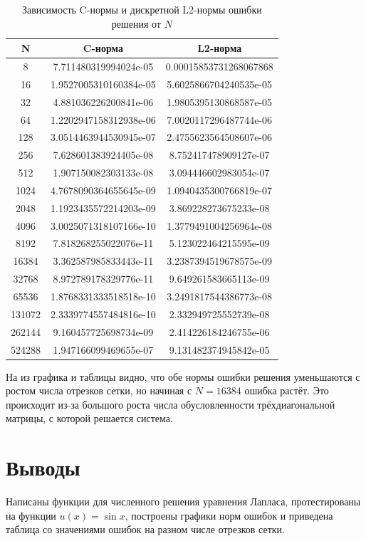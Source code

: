 \documentclass{article}
\begin{document}
\begin{table}[!hq]
    \centering
    \begin{tabular}{|c|c|c|}
        \hline
        N & C-норма & L2-норма \\ \hline
  8 & 7.711480319994024e-05 &  0.00015853731268067868 \\ \hline
  16 & 1.9527005310160384e-05 &  5.6025866704240535e-05 \\ \hline
  32 & 4.881036226200841e-06 &  1.9805395130868587e-05 \\ \hline
  64 & 1.2202947158312938e-06 &  7.0020117296487744e-06 \\ \hline
  128 & 3.0514463944530945e-07 &  2.4755623564508607e-06 \\ \hline
  256 & 7.628601383924405e-08 &  8.752417478909127e-07 \\ \hline
  512 & 1.907150082303133e-08 &  3.094446602983054e-07 \\ \hline
  1024 & 4.7678090364655645e-09 &  1.0940435300766819e-07 \\ \hline
  2048 & 1.1923435572214203e-09 &  3.869228273675233e-08 \\ \hline
  4096 & 3.0025071318107166e-10 &  1.3779491004256964e-08 \\ \hline
  8192 & 7.818268255022076e-11 &  5.123022464215595e-09 \\ \hline
  16384 & 3.362587985833443e-11 &  3.2387394519678575e-09 \\ \hline
  32768 & 8.972789178329776e-11 &  9.649261583665113e-09 \\ \hline
  65536 & 1.8768331333518518e-10 &  3.2491817544386773e-08 \\ \hline
  131072 & 2.3339774557484816e-10 &  2.332949725552739e-08 \\ \hline
  262144 & 9.160457725698734e-09 &  2.414226184246755e-06 \\ \hline
  524288 & 1.947166099469655e-07 &  9.131482374945842e-05 \\ \hline
    \end{tabular}
    \caption{Зависимость C-нормы и дискретной L2-нормы ошибки решения от $N$}
    \label{tab:table}
\end{table}

На из графика и таблицы видно, что обе нормы ошибки решения уменьшаются с ростом числа отрезков сетки, но начиная с $N = 16384$ ошибка растёт. Это происходит из-за большого роста числа обусловленности трёхдиагональной матрицы, с которой  решается система.

\section{Выводы}

Написаны функции для численного решения уравнения Лапласа, протестированы на функции $u(x) = \sin x$, построены графики норм ошибок и приведена таблица со значениями ошибок на разном числе отрезков сетки.
\end{document}
